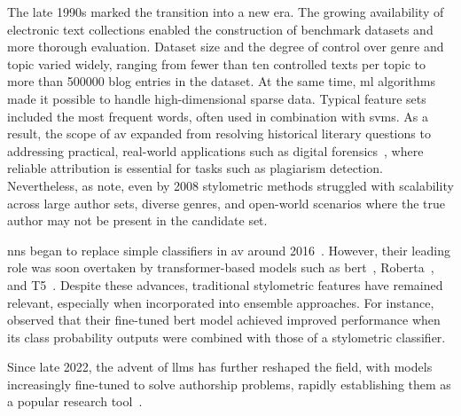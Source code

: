 The late 1990s marked the transition into a new era. 
The growing availability of electronic text collections enabled the construction of benchmark datasets and more thorough evaluation. 
Dataset size and the degree of control over genre and topic varied widely, ranging from fewer than ten controlled texts per topic to more than \num{500000} blog entries in the \dataBlog{} dataset. %
At the same time, \ac{ml} algorithms made it possible to handle high-dimensional sparse data. 
Typical feature sets included the most frequent words, often used in combination with \acp{svm}.
As a result, the scope of \ac{av} expanded from resolving historical literary questions to addressing practical, real-world applications such as digital forensics~\citep{stamatatos_survey_2009}, where reliable attribution is essential for tasks such as plagiarism detection.
Nevertheless, as \citet{abbasi_writeprints_2008} note, even by 2008 stylometric methods struggled with scalability across large author sets, diverse genres, and open-world scenarios where the true author may not be present in the candidate set.

\acp{nn} began to replace simple classifiers in \ac{av} around 2016~\citep{schmidt_llm_av_latin_24}. 
However, their leading role was soon overtaken by transformer-based models such as \acs{bert}~\citep{bert_2019}, Ro\acs{bert}a~\citep{roberta_2019}, and T5~\citep{t5_2020}. 
Despite these advances, traditional stylometric features have remained relevant, especially when incorporated into ensemble approaches. 
For instance, \citet{bertaa_2020} observed that their fine-tuned \acs{bert} model achieved improved performance when its class probability outputs were combined with those of a stylometric classifier.

Since late 2022, the advent of \acp{llm} has further reshaped the field, with models increasingly fine-tuned to solve authorship problems, rapidly establishing them as a popular research tool~\citep{schmidt_llm_av_latin_24}.
